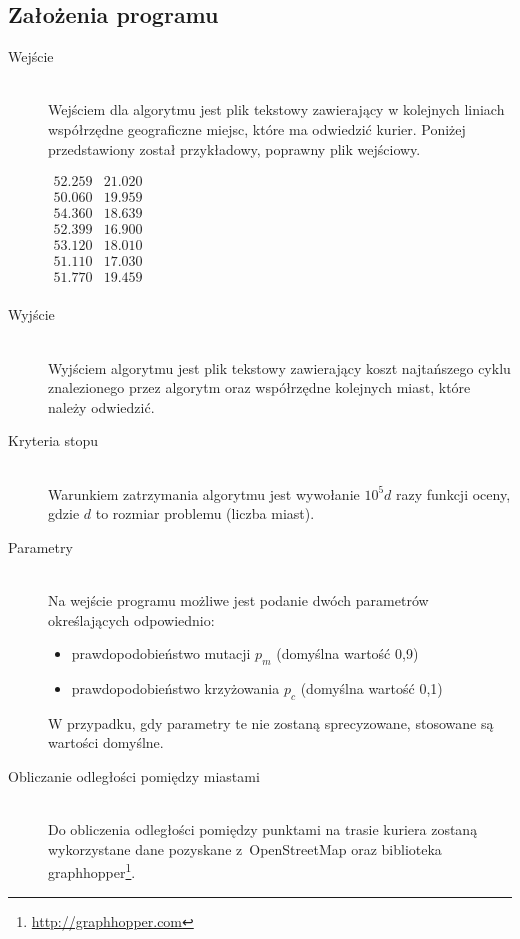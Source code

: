 \documentclass[12pt, a4paper]{article}
\begin{document}
\subsection{Założenia programu}
\begin{description}
	\item[Wejście] \hfill \\
Wejściem dla algorytmu jest plik tekstowy zawierający w kolejnych liniach współrzędne geograficzne miejsc, które ma odwiedzić kurier. Poniżej przedstawiony został przykładowy, poprawny plik wejściowy.

\bigskip
$ 
\begin{array}{ll}
52.259 &  21.020 \\
50.060 & 19.959 \\ 
54.360 & 18.639 \\
52.399 & 16.900 \\
53.120 & 18.010 \\
51.110 & 17.030  \\
51.770 & 19.459 \\
\end{array}
$

	\item[Wyjście] \hfill \\
	Wyjściem algorytmu jest plik tekstowy zawierający koszt najtańszego cyklu znalezionego przez algorytm oraz współrzędne kolejnych miast, które należy odwiedzić.
	\item[Kryteria stopu] \hfill \\
	Warunkiem zatrzymania algorytmu jest wywołanie $10^5d$ razy funkcji oceny, gdzie $d$ to rozmiar problemu (liczba miast).
	\item[Parametry] \hfill \\
	Na wejście programu możliwe jest podanie dwóch parametrów określających odpowiednio:
		\begin{itemize}
			\item prawdopodobieństwo mutacji $p_m$ (domyślna wartość 0,9)
			\item prawdopodobieństwo krzyżowania $p_c$ (domyślna wartość 0,1)
		\end{itemize}
		W przypadku, gdy parametry te nie zostaną sprecyzowane, stosowane są wartości domyślne.
	\item [Obliczanie odległości pomiędzy miastami] \hfill \\
		Do obliczenia odległości pomiędzy punktami na trasie kuriera zostaną wykorzystane dane pozyskane z~OpenStreetMap oraz biblioteka graphhopper\footnote{\url{http://graphhopper.com}}.

\end{description}
\end{document}
